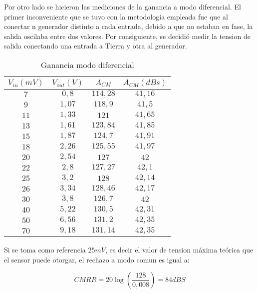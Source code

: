 \documentclass[a4paper]{article}
\begin{document}
Por otro lado se hicieron las mediciones de la ganancia a modo diferencial. El primer inconveniente que se tuvo con la metodolog\'ia empleada fue que al conectar n generador distinto a cada entrada, debido a que no estaban en fase, la salida oscilaba entre dos valores. Por consiguiente, se decidi\'o medir la tension de salida conectando una entrada a Tierra y otra al generador. 

\begin{table}[H]
\centering
\begin{tabular}{cccc}\hline
$V_{in}(mV)$ & $V_{out}(V)$ & $A_{CM}$ & $A_{CM} (dBs)$ \\
\hline
$7$   & $0,8$  & $114,28$ & $41,16$ \\
$9$  & $1,07$ & $118,9$ & $41,5$\\
$11$  & $1,33$ & $121$ & $41,65$\\
$13$  & $1,61$ & $123,84$ & $41,85$\\
$15$  & $1,87$ & $124,7$ & $41,91$\\
$18$  & $2,26$ & $125,55$ & $41,97$\\
$20$  & $2,54$ & $127$ & $42$\\
$22$  & $2,8$ & $127,27$ & $42,1$\\
$25$  & $3,2$ & $128$ & $42,14$\\
$26$  & $3,34$ & $128,46$ & $42,17$\\
$30$  & $3,8$ & $126,7$ & $42$\\
$40$  & $5,22$ & $130,5$ & $42,31$\\
$50$  & $6,56$ & $131,2$ & $42,35$\\
$70$  & $9,18$ & $131,14$ & $42,35$\\ \hline
\end{tabular}
\caption{Ganancia modo diferencial}
\label{table:ganancia_diferencial}
\end{table}

Si se toma como referencia $25mV$, es decir el valor de tension m\'axima te\'orica que el sensor puede otorgar, el rechazo a modo comun es igual a:

\begin{equation}
CMRR = 20\log(\frac{128}{0,008}) = \boxed{84 dBS}
\end{equation}
\end{document}
